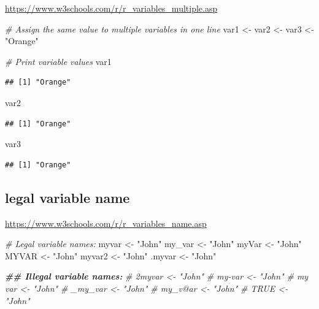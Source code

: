 \documentclass[
]{book}
\newenvironment{Shaded}{\begin{snugshade}}{\end{snugshade}}
\newcommand{\CommentTok}[1]{\textcolor[rgb]{0.56,0.35,0.01}{\textit{#1}}}
\newcommand{\DocumentationTok}[1]{\textcolor[rgb]{0.56,0.35,0.01}{\textbf{\textit{#1}}}}
\newcommand{\NormalTok}[1]{#1}
\newcommand{\OtherTok}[1]{\textcolor[rgb]{0.56,0.35,0.01}{#1}}
\newcommand{\StringTok}[1]{\textcolor[rgb]{0.31,0.60,0.02}{#1}}
\theoremstyle{definition}
\theoremstyle{definition}
\theoremstyle{definition}
\theoremstyle{definition}
\theoremstyle{remark}
\begin{document}
\url{https://www.w3schools.com/r/r_variables_multiple.asp}

\begin{Shaded}
\begin{Highlighting}[]
\CommentTok{\# Assign the same value to multiple variables in one line}
\NormalTok{var1 }\OtherTok{\textless{}{-}}\NormalTok{ var2 }\OtherTok{\textless{}{-}}\NormalTok{ var3 }\OtherTok{\textless{}{-}} \StringTok{"Orange"}

\CommentTok{\# Print variable values}
\NormalTok{var1}
\end{Highlighting}
\end{Shaded}

\begin{verbatim}
## [1] "Orange"
\end{verbatim}

\begin{Shaded}
\begin{Highlighting}[]
\NormalTok{var2}
\end{Highlighting}
\end{Shaded}

\begin{verbatim}
## [1] "Orange"
\end{verbatim}

\begin{Shaded}
\begin{Highlighting}[]
\NormalTok{var3}
\end{Highlighting}
\end{Shaded}

\begin{verbatim}
## [1] "Orange"
\end{verbatim}

\subsection{legal variable name}\label{legal-variable-name}

\url{https://www.w3schools.com/r/r_variables_name.asp}

\begin{Shaded}
\begin{Highlighting}[]
\CommentTok{\# Legal variable names:}
\NormalTok{myvar }\OtherTok{\textless{}{-}} \StringTok{"John"}
\NormalTok{my\_var }\OtherTok{\textless{}{-}} \StringTok{"John"}
\NormalTok{myVar }\OtherTok{\textless{}{-}} \StringTok{"John"}
\NormalTok{MYVAR }\OtherTok{\textless{}{-}} \StringTok{"John"}
\NormalTok{myvar2 }\OtherTok{\textless{}{-}} \StringTok{"John"}
\NormalTok{.myvar }\OtherTok{\textless{}{-}} \StringTok{"John"}

\DocumentationTok{\#\# Illegal variable names:}
\CommentTok{\# 2myvar \textless{}{-} "John"}
\CommentTok{\# my{-}var \textless{}{-} "John"}
\CommentTok{\# my var \textless{}{-} "John"}
\CommentTok{\# \_my\_var \textless{}{-} "John"}
\CommentTok{\# my\_v@ar \textless{}{-} "John"}
\CommentTok{\# TRUE \textless{}{-} "John"}
\end{Highlighting}
\end{Shaded}
\end{document}
